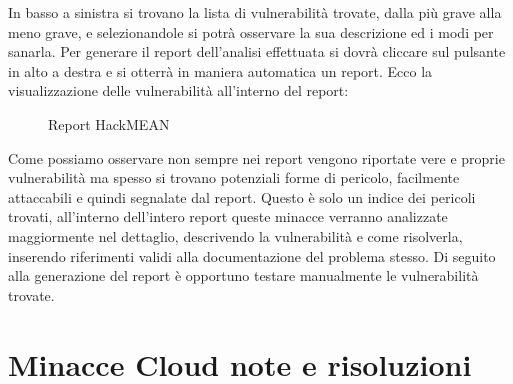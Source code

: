 In basso a sinistra si trovano la lista di vulnerabilità trovate, dalla più grave alla meno grave, e selezionandole si potrà osservare la sua descrizione ed i modi per sanarla.
Per generare il report dell’analisi effettuata si dovrà cliccare sul pulsante in alto a destra e si otterrà in maniera automatica un report. 
Ecco la visualizzazione delle vulnerabilità all’interno del report:

\begin{figure}[H]
    \caption{Report HackMEAN }
    \label{fig:reportHackMEAN}
\end{figure}

Come possiamo osservare non sempre nei report vengono riportate vere e proprie vulnerabilità ma spesso si trovano potenziali forme di pericolo, facilmente attaccabili e quindi segnalate dal report.
Questo è solo un indice dei pericoli trovati, all’interno dell’intero report queste minacce verranno analizzate maggiormente nel dettaglio, descrivendo la vulnerabilità e come risolverla, inserendo riferimenti validi alla documentazione del problema stesso.
Di seguito alla generazione del report è opportuno testare manualmente le vulnerabilità trovate. 
\chapter{Minacce Cloud note e risoluzioni}

